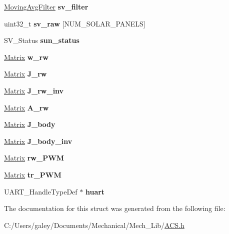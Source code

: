 \begin{DoxyCompactItemize}
\item 
\mbox{\label{struct_a_c_s_type_ae1e2a82621824ccb4bc27eb3dc76c924}} 
\mbox{\hyperlink{struct___moving_avg_filter}{Moving\+Avg\+Filter}} {\bfseries sv\+\_\+filter}
\item 
\mbox{\label{struct_a_c_s_type_af83838a9c78e0c708fc7ce4b95e4609d}} 
uint32\+\_\+t {\bfseries sv\+\_\+raw} \mbox{[}N\+U\+M\+\_\+\+S\+O\+L\+A\+R\+\_\+\+P\+A\+N\+E\+LS\mbox{]}
\item 
\mbox{\label{struct_a_c_s_type_a08e060b8d3806d1da157f82ff6ef89c0}} 
S\+V\+\_\+\+Status {\bfseries sun\+\_\+status}
\item 
\mbox{\label{struct_a_c_s_type_a880b6eef6382841a030de56f08f7c234}} 
\mbox{\hyperlink{struct___matrix}{Matrix}} {\bfseries w\+\_\+rw}
\item 
\mbox{\label{struct_a_c_s_type_ae3e39e9013f49cf0f58982ab30dff4e5}} 
\mbox{\hyperlink{struct___matrix}{Matrix}} {\bfseries J\+\_\+rw}
\item 
\mbox{\label{struct_a_c_s_type_a1f6625b6635f3eb93819d23c8e73d3cd}} 
\mbox{\hyperlink{struct___matrix}{Matrix}} {\bfseries J\+\_\+rw\+\_\+inv}
\item 
\mbox{\label{struct_a_c_s_type_a1e497ee0d383f2891d76ec4eb94943f4}} 
\mbox{\hyperlink{struct___matrix}{Matrix}} {\bfseries A\+\_\+rw}
\item 
\mbox{\label{struct_a_c_s_type_ae9005a98c5e356c3c718057fb431215a}} 
\mbox{\hyperlink{struct___matrix}{Matrix}} {\bfseries J\+\_\+body}
\item 
\mbox{\label{struct_a_c_s_type_a347bdaa887a9c2a386f0785e238f1823}} 
\mbox{\hyperlink{struct___matrix}{Matrix}} {\bfseries J\+\_\+body\+\_\+inv}
\item 
\mbox{\label{struct_a_c_s_type_abadd729b1d9de2b8414c7949637aac27}} 
\mbox{\hyperlink{struct___matrix}{Matrix}} {\bfseries rw\+\_\+\+P\+WM}
\item 
\mbox{\label{struct_a_c_s_type_a479836cb6277d49ac363e5aef596c7db}} 
\mbox{\hyperlink{struct___matrix}{Matrix}} {\bfseries tr\+\_\+\+P\+WM}
\item 
\mbox{\label{struct_a_c_s_type_a1ed7dab212fde0a3a4600d33399c67b6}} 
U\+A\+R\+T\+\_\+\+Handle\+Type\+Def $\ast$ {\bfseries huart}
\end{DoxyCompactItemize}


The documentation for this struct was generated from the following file\+:\begin{DoxyCompactItemize}
\item 
C\+:/\+Users/galey/\+Documents/\+Mechanical/\+Mech\+\_\+\+Lib/\mbox{\hyperlink{_a_c_s_8h}{A\+C\+S.\+h}}\end{DoxyCompactItemize}
